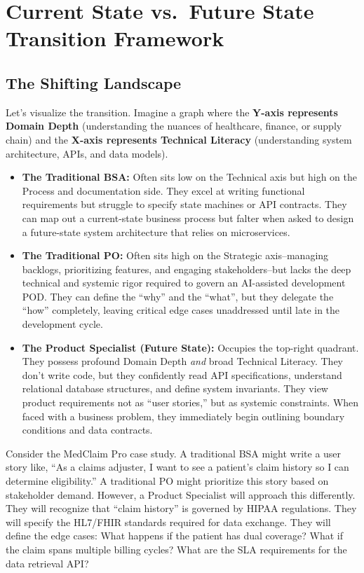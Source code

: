 \documentclass[
  11pt,
  openany,
  oneside]{book}
\providecommand{\tightlist}{%
  \setlength{\itemsep}{0pt}\setlength{\parskip}{0pt}}
\begin{document}
\section{Current State vs.~Future State Transition
Framework}\label{current-state-vs.-future-state-transition-framework}

\subsection{The Shifting Landscape}\label{the-shifting-landscape}

Let's visualize the transition. Imagine a graph where the \textbf{Y-axis
represents Domain Depth} (understanding the nuances of healthcare,
finance, or supply chain) and the \textbf{X-axis represents Technical
Literacy} (understanding system architecture, APIs, and data models).

\begin{itemize}
\tightlist
\item
  \textbf{The Traditional BSA:} Often sits low on the Technical axis but
  high on the Process and documentation side. They excel at writing
  functional requirements but struggle to specify state machines or API
  contracts. They can map out a current-state business process but
  falter when asked to design a future-state system architecture that
  relies on microservices.
\item
  \textbf{The Traditional PO:} Often sits high on the Strategic
  axis--managing backlogs, prioritizing features, and engaging
  stakeholders--but lacks the deep technical and systemic rigor required
  to govern an AI-assisted development POD. They can define the ``why''
  and the ``what'', but they delegate the ``how'' completely, leaving
  critical edge cases unaddressed until late in the development cycle.
\item
  \textbf{The Product Specialist (Future State):} Occupies the top-right
  quadrant. They possess profound Domain Depth \emph{and} broad
  Technical Literacy. They don't write code, but they confidently read
  API specifications, understand relational database structures, and
  define system invariants. They view product requirements not as ``user
  stories,'' but as systemic constraints. When faced with a business
  problem, they immediately begin outlining boundary conditions and data
  contracts.
\end{itemize}

Consider the MedClaim Pro case study. A traditional BSA might write a
user story like, ``As a claims adjuster, I want to see a patient's claim
history so I can determine eligibility.'' A traditional PO might
prioritize this story based on stakeholder demand. However, a Product
Specialist will approach this differently. They will recognize that
``claim history'' is governed by HIPAA regulations. They will specify
the HL7/FHIR standards required for data exchange. They will define the
edge cases: What happens if the patient has dual coverage? What if the
claim spans multiple billing cycles? What are the SLA requirements for
the data retrieval API?
\end{document}
